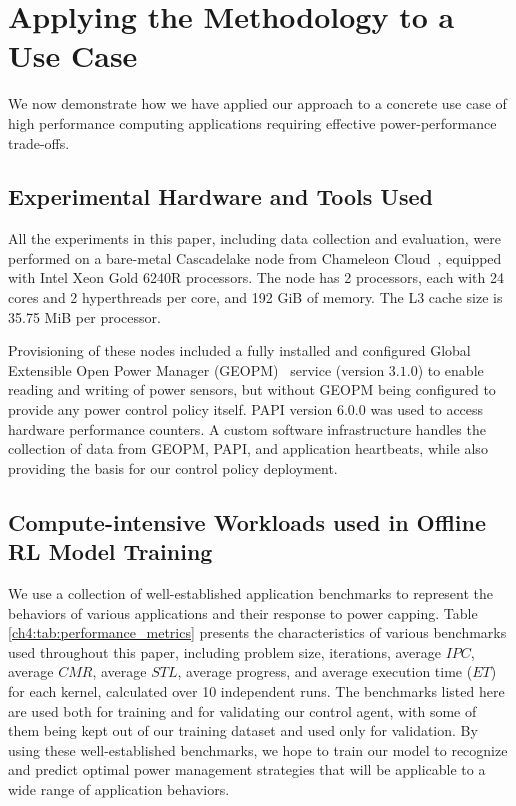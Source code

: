 \section{Applying the Methodology to a Use Case}\label{sec:setup}

We now demonstrate how we have applied our approach to a concrete use case of high performance computing applications requiring effective power-performance trade-offs. 

\subsection{Experimental Hardware and Tools Used}
All the experiments in this paper, including data collection and evaluation, were performed on a bare-metal Cascadelake node from Chameleon Cloud~\cite{keahey2019chameleon}, equipped with Intel Xeon Gold 6240R processors. The node has 2 processors, each with 24 cores and 2 hyperthreads per core, and 192 GiB of memory. The L3 cache size is 35.75 MiB per processor.

Provisioning of these nodes included a fully installed and configured Global Extensible Open Power Manager (GEOPM)~\cite{eastep2017global} service (version $3.1.0$) to enable reading and writing of power sensors, but without GEOPM being configured to provide any power control policy itself. PAPI version $6.0.0$ was used to access hardware performance counters. A custom software infrastructure handles the collection of data from GEOPM, PAPI, and application heartbeats, while also providing the basis for our control policy deployment.

\subsection{Compute-intensive Workloads used in Offline RL Model Training}

We use a collection of well-established application benchmarks to represent the behaviors of various applications and their response to power capping. Table \ref{ch4:tab:performance_metrics} presents the characteristics of various benchmarks used throughout this paper, including problem size, iterations, average $IPC$, average $CMR$, average $STL$, average progress, and average execution time ($ET$) for each kernel, calculated over 10 independent runs. The benchmarks
listed here are used both for training and for validating our control agent, with some of them being kept out of our training dataset and used  only for validation. By using these well-established benchmarks, we hope to train our model to recognize and predict optimal power management strategies that will be applicable to a wide range of application behaviors.

